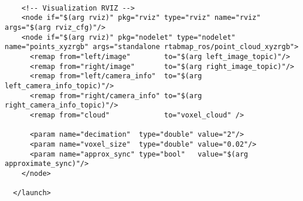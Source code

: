 \begin{center}
\begin{footnotesize}
\begin{verbatim}
    
    <!-- Visualization RVIZ -->
    <node if="$(arg rviz)" pkg="rviz" type="rviz" name="rviz" args="$(arg rviz_cfg)"/>
    <node if="$(arg rviz)" pkg="nodelet" type="nodelet" name="points_xyzrgb" args="standalone rtabmap_ros/point_cloud_xyzrgb">
      <remap from="left/image"        to="$(arg left_image_topic)"/>
      <remap from="right/image"       to="$(arg right_image_topic)"/>
      <remap from="left/camera_info"  to="$(arg left_camera_info_topic)"/>
      <remap from="right/camera_info" to="$(arg right_camera_info_topic)"/>
      <remap from="cloud"             to="voxel_cloud" />

      <param name="decimation"  type="double" value="2"/>
      <param name="voxel_size"  type="double" value="0.02"/>
      <param name="approx_sync" type="bool"   value="$(arg approximate_sync)"/>
    </node>

  </launch>

\end{verbatim}
\end{footnotesize}
\end{center}